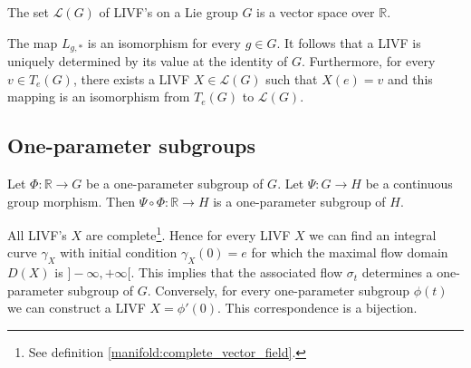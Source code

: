 	\begin{property}
		The set $\mathcal{L}(G)$ of LIVF's on a Lie group $G$ is a vector space over $\mathbb{R}$.
	\end{property}
	\begin{property}
		\label{lie:livf_prop}
		The map $L_{g,\ast}$ is an isomorphism for every $g\in G$. It follows that a LIVF is uniquely determined by its value at the identity of $G$. Furthermore, for every $v\in T_e(G)$, there exists a LIVF $X\in\mathcal{L}(G)$ such that $X(e) = v$ and this mapping is an isomorphism from $T_e(G)$ to $\mathcal{L}(G)$.
	\end{property}

\subsection{One-parameter subgroups}


        \begin{property}\label{group:OPS_composition}
        	Let $\Phi:\mathbb{R}\rightarrow G$ be a one-parameter subgroup of $G$. Let $\Psi:G\rightarrow H$ be a continuous group morphism. Then $\Psi\circ\Phi:\mathbb{R}\rightarrow H$ is a one-parameter subgroup of $H$.
        \end{property}
        
        \begin{property}\label{lie:livf_subgroup}
        	All LIVF's $X$ are complete\footnote{See definition \ref{manifold:complete_vector_field}.}. Hence for every LIVF $X$ we can find an integral curve $\gamma_X$ with initial condition $\gamma_X(0) = e$ for which the maximal flow domain\footnotemark\ $D(X)$ is $]-\infty, +\infty[$. This implies that the associated flow $\sigma_t$ determines a one-parameter subgroup of $G$. Conversely, for every one-parameter subgroup $\phi(t)$ we can construct a LIVF $X = \phi'(0)$. This correspondence is a bijection.
        \end{property}

